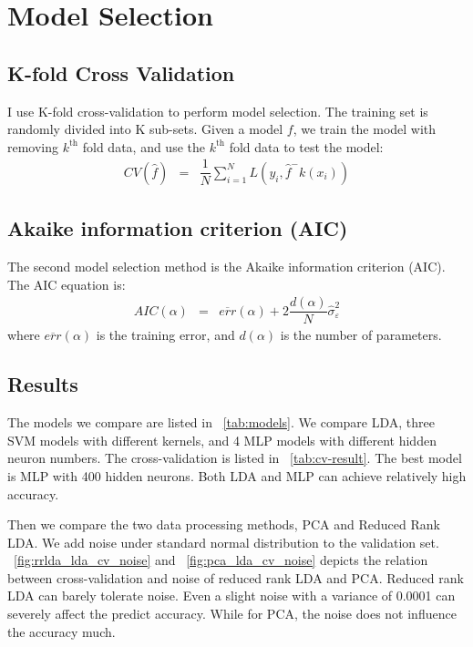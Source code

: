 \section{Model Selection}
\label{sec:model-selection}

\subsection{K-fold Cross Validation}
\label{sec:model-selection:k-fold}

I use K-fold cross-validation to perform model selection.
The training set is randomly divided into K sub-sets.
Given a model $f$, we train the model with removing $k^{\mathrm{th}}$ fold data, and use the $k^{\mathrm{th}}$ fold data to test the model:
\begin{eqnarray}
    CV\left(\hat{f}\right) & = & \dfrac{1}{N}\sum_{i=1}^{N} L\left(y_i,\hat{f}^-k\left(x_i\right)\right)
    \label{eqn:cv}
\end{eqnarray}

\subsection{Akaike information criterion (AIC)}
\label{sec:model-selection:aic}

The second model selection method is the Akaike information criterion (AIC).
The AIC equation is:
\begin{eqnarray}
    AIC\left(\alpha\right) & = & \overline{err}\left(\alpha\right) + 2 \dfrac{d\left(\alpha\right)}{N}
    \hat{\sigma}_\varepsilon^2
\end{eqnarray}
where $\overline{err}\left(\alpha\right)$ is the training error, and $d\left(\alpha\right)$ is the number of parameters.

\subsection{Results}
\label{sec:model-selection:results}


The models we compare are listed in \tablename{}~\ref{tab:models}.
We compare LDA, three SVM models with different kernels, and 4 MLP models with different hidden neuron numbers.
The cross-validation is listed in \tablename{}~\ref{tab:cv-result}.
The best model is MLP with 400 hidden neurons.
Both LDA and MLP can achieve relatively high accuracy.

Then we compare the two data processing methods, PCA and Reduced Rank LDA.
We add noise under standard normal distribution to the validation set.
\figurename{}~\ref{fig:rrlda_lda_cv_noise} and \figurename{}~\ref{fig:pca_lda_cv_noise} depicts the relation between cross-validation and noise of reduced rank LDA and PCA.
Reduced rank LDA can barely tolerate noise.
Even a slight noise with a variance of 0.0001 can severely affect the predict accuracy.
While for PCA, the noise does not influence the accuracy much.

